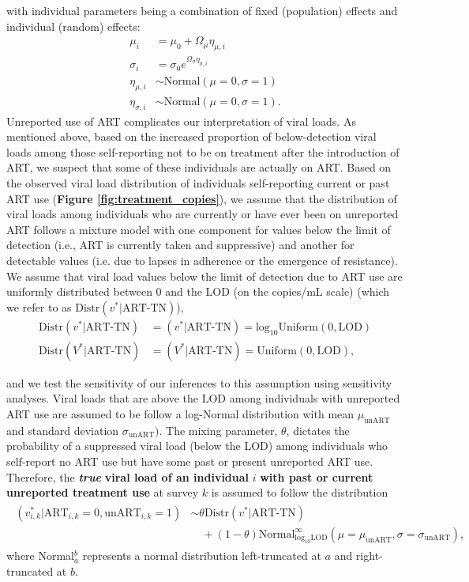 \documentclass{article}[11pt]
\begin{document}
with individual parameters being a combination of fixed (population) effects and individual (random) effects:
\begin{equation}
\begin{split}
\mu_i &= \mu_0 + \Omega_\mu\eta_{\mu,i} \\
\sigma_i &= \sigma_0e^{\Omega_\sigma\eta_{\sigma,i}}\\
\eta_{\mu,i} & \sim \text{Normal}(\mu=0,\sigma=1)\\
\eta_{\sigma,i} & \sim \text{Normal}(\mu=0,\sigma=1).
\end{split}
\end{equation}
Unreported use of ART complicates our interpretation of viral loads. As mentioned above, based on the increased proportion of below-detection viral loads among those self-reporting not to be on treatment after the introduction of ART, we suspect that some of these individuals are actually on ART. Based on the observed viral load distribution of individuals self-reporting current or past ART use (\textbf{Figure \ref{fig:treatment_copies}}), we assume that the distribution of viral loads among individuals who are currently or have ever been on unreported ART follows a mixture model with one component for values below the limit of detection (i.e., ART is currently taken and suppressive) and another for detectable values (i.e. due to lapses in adherence or the emergence of resistance). We assume that viral load values below the limit of detection due to ART use are uniformly distributed between 0 and the LOD (on the copies/mL scale) (which we refer to as $\text{Distr}(v^*|\text{ART-TN})$),
\begin{align}
\text{Distr}(v^*|\text{ART-TN}) &= (v^*|\text{ART-TN}) = \text{log}_{10}\text{Uniform}(0,\text{LOD}) \\
\text{Distr}(V^*|\text{ART-TN}) &= (V^*|\text{ART-TN}) = \text{Uniform}(0,\text{LOD}),
\label{eq:distr_art_bd}
\end{align}

and we test the sensitivity of our inferences to this assumption using sensitivity analyses.  Viral loads that are above the LOD among individuals with unreported ART use are assumed to be follow a log-Normal distribution with mean $\mu_\text{unART}$ and standard deviation $\sigma_\text{unART})$. The mixing parameter, $\theta$, dictates the probability of a suppressed viral load (below the LOD) among individuals who self-report no ART use but have some past or present unreported ART use. Therefore, the \textbf{\textit{true }}\textbf{viral load of an individual} $i$ \textbf{with past or current unreported treatment use} at survey $k$ is assumed to follow the distribution
\begin{align}
\begin{split}
(v_{i,k}^*|\text{ART}_{i,k}=0,\text{unART}_{i,k}=1) & \sim \theta\text{Distr}(v^*|\text{ART-TN})\\
&\quad +(1-\theta)\text{Normal}_{\text{log}_{10}\text{LOD}}^{\infty}(\mu=\mu_\text{unART}, \sigma=\sigma_\text{unART}),
\label{eq:spvl_unart}
\end{split}
\end{align}
where Normal$_a^b$ represents a normal distribution left-truncated at $a$ and right-truncated at $b$.
\end{document}
